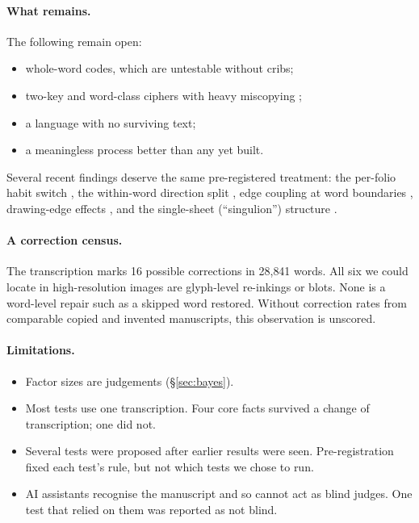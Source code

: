 \documentclass[11pt,a4paper]{article}
\begin{document}
\paragraph{What remains.} The following remain open:
\begin{itemize}
\item whole-word codes, which are untestable without cribs;
\item two-key and word-class ciphers with heavy miscopying \citep{zhang2026voynich};
\item a language with no surviving text;
\item a meaningless process better than any yet built.
\end{itemize}
Several recent findings deserve the same pre-registered treatment: the per-folio habit switch \citep{parisel2026currier}, the within-word direction split \citep{parisel2026layered}, edge coupling at word boundaries \citep{rozanova2026units}, drawing-edge effects \citep{steckley2024intent}, and the single-sheet (``singulion'') structure \citep{layfield2026singulion}.

\paragraph{A correction census.} The transcription marks 16 possible corrections in 28{,}841 words. All six we could locate in high-resolution images are glyph-level re-inkings or blots. None is a word-level repair such as a skipped word restored. Without correction rates from comparable copied and invented manuscripts, this observation is unscored.

\paragraph{Limitations.}
\begin{itemize}
\item Factor sizes are judgements (\S\ref{sec:bayes}).
\item Most tests use one transcription. Four core facts survived a change of transcription; one did not.
\item Several tests were proposed after earlier results were seen. Pre-registration fixed each test's rule, but not which tests we chose to run.
\item AI assistants recognise the manuscript and so cannot act as blind judges. One test that relied on them was reported as not blind.
\end{itemize}
\end{document}
